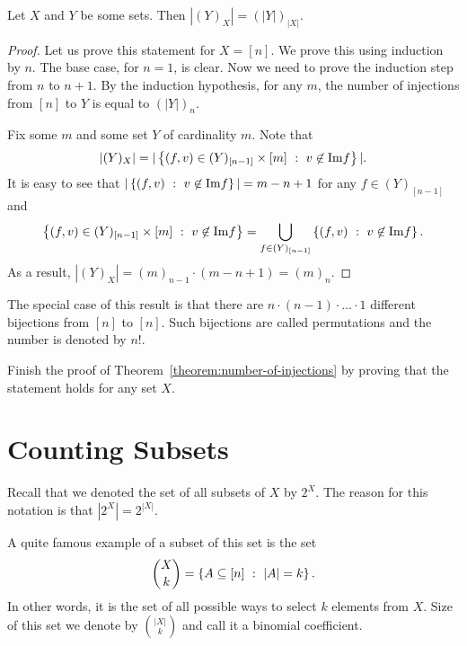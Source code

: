 \begin{theorem}
\label{theorem:number-of-injections}
  Let $X$ and $Y$ be some sets. Then $|(Y)_X| = (|Y|)_{|X|}$.
\end{theorem}
\begin{proof}
  Let us prove this statement for $X = [n]$. We prove this using induction by
  $n$. The base case, for $n = 1$, is clear. Now we need to prove the induction
  step from $n$ to $n + 1$. By the induction hypothesis, for any $m$, the
  number of injections from $[n]$ to $Y$ is equal to $(|Y|)_n$.

  Fix some $m$ and some set $Y$ of cardinality $m$. Note that
  \[
    |(Y)_X| =
    |\set[v \not\in \Im f]{(f, v) \in (Y)_{[n - 1]} \times [m]}|.
  \]
  It is easy to see that $|\set[v \not\in \Im f]{(f, v)}| = m - n + 1$
  for any $f \in (Y)_{[n - 1]}$ and
  \[
    \set[v \not\in \Im f]{(f, v) \in (Y)_{[n - 1]} \times [m]} =
    \bigcup\limits_{f \in (Y)_{[n - 1]}} \set[v \not\in \Im f]{(f, v)}.
  \]
  As a result, $|(Y)_X| = (m)_{n - 1} \cdot (m - n + 1) = (m)_n$.
\end{proof}

The special case of this result is that there are
$n \cdot (n - 1) \cdot  \ldots \cdot  1$ different
bijections from $[n]$ to $[n]$. Such bijections are called permutations and the
number is denoted by $n!$.

\begin{exercise}
  Finish the proof of Theorem~\ref{theorem:number-of-injections} by proving that
  the statement holds for any set $X$.
\end{exercise}

\section{Counting Subsets}
Recall that we denoted the set of all subsets of $X$ by $2^X$. The reason for
this notation is that $|2^X| = 2^{|X|}$.

A quite famous example of a subset of this set is the set
\[
  \binom{X}{k} = \set[|A| = k]{A \subseteq [n]}.
\]
In other words, it is the set of all possible ways to select $k$ elements from
$X$. Size of this set we denote by $\binom{|X|}{k}$ and call it a binomial
coefficient.

